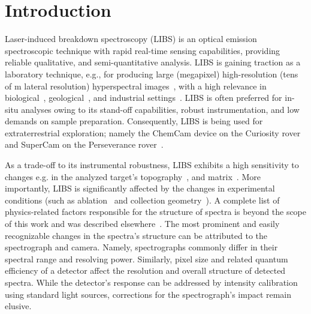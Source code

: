 \documentclass[preprint,11pt]{elsarticle}
\begin{document}

\section{Introduction}
\label{sec:Intro}
\noindent
Laser-induced breakdown spectroscopy (LIBS) is an optical emission spectroscopic technique with rapid real-time sensing capabilities, providing reliable qualitative, and semi-quantitative analysis. LIBS is gaining traction as a laboratory technique, e.g., for producing large (megapixel) high-resolution (tens of \textmu m lateral resolution) hyperspectral images~\cite{limbeck2021methodology, MOTTOROS2020329}, with a high relevance in biological~\cite{MODLITBOVA2021}, geological~\cite{nardecchia2020detection}, and industrial settings~\cite{jolivet2020quantitative}. LIBS is often preferred for in-situ analyses owing to its stand-off capabilities, robust instrumentation, and low demands on sample preparation. Consequently, LIBS is being used for extraterrestrial exploration; namely the ChemCam device on the Curiosity rover~\cite{Wiens2012} and SuperCam on the Perseverance rover~\cite{Wiens2020}.

As a trade-off to its instrumental robustness, LIBS exhibits a high sensitivity to changes e.g. in the analyzed target’s topography~\cite{SALAJKOVA2021}, and matrix~\cite{TAKAHASHI2017}. More importantly, LIBS is significantly affected by the changes in experimental conditions (such as ablation~\cite{KEPES20201_ORTHO, KEPES_NONORTHO} and collection geometry~\cite{SHABANOV2018}). A complete list of physics-related factors responsible for the structure of spectra is beyond the scope of this work and was described elsewhere~\cite{LIBS_book_2006}. The most prominent and easily recognizable changes in the spectra’s structure can be attributed to the spectrograph and camera. Namely, spectrographs commonly differ in their spectral range and resolving power. Similarly, pixel size and related quantum efficiency of a detector affect the resolution and overall structure of detected spectra. While the detector’s response can be addressed by intensity calibration using standard light sources, corrections for the spectrograph’s impact remain elusive. 
\end{document}
